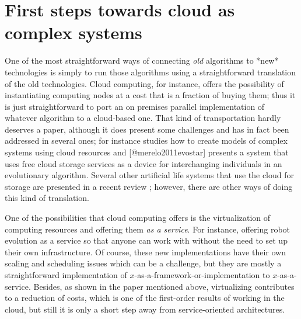 \documentclass[utf8]{frontiersSCNS} %
\begin{document}
\section{First steps towards cloud as complex systems}

One of the most straightforward ways of connecting {\em old} algorithms to
*new* technologies is simply to run those algorithms using a
straightforward translation of the old technologies. Cloud computing,
for instance, offers the possibility of instantiating computing nodes
at a cost that is a fraction of buying them; thus it is just
straightforward to port an on premises parallel implementation of
whatever algorithm to a cloud-based one. That kind of transportation
hardly deserves a paper, although it does present some challenges and
has in fact been addressed in several ones; for instance \citep{Medel2017}
studies how to create models of complex systems using cloud resources
and [@merelo2011evostar] presents a system that uses free cloud
storage services as a device for interchanging individuals in an
evolutionary algorithm. Several other artificial life systems that use
the cloud for storage are presented in a recent review \citep{taylor2016webal}; however, there are other ways of doing this kind
of translation.

One of the possibilities that cloud computing offers
is the virtualization of computing resources and offering them {\em as a
service}. For instance, offering robot evolution as a service
\citep{du2017robot,chen2010robot} so that anyone can work with without the
need to set up their own infrastructure. Of course, these new
implementations have their own scaling and scheduling issues which can
be a challenge, but they are mostly a straightforward implementation
of $x$-as-a-framework-or-implementation to $x$-as-a-service. Besides,
as shown in the paper mentioned above, virtualizing contributes to a
reduction of costs, which is one of the first-order results of working
in the cloud, but still it is only a short step away from
service-oriented architectures.  
\end{document}
